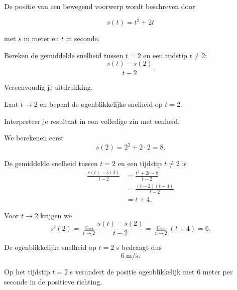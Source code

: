\documentclass{ximera}
\begin{document}
\begin{oefening}{\oefU\ESS}

De positie van een bewegend voorwerp wordt beschreven door

\[
s(t)=t^2+2t
\]

met $s$ in meter en $t$ in seconde.

\begin{question}
Bereken de gemiddelde snelheid tussen $t=2$ en een tijdstip $t\neq2$:
\[
\frac{s(t)-s(2)}{t-2}.
\]
\end{question}

\begin{question}
Vereenvoudig je uitdrukking.
\end{question}

\begin{question}
Laat $t\to2$ en bepaal de ogenblikkelijke snelheid op $t=2$.
\end{question}

\begin{question}
Interpreteer je resultaat in een volledige zin met eenheid.
\end{question}

\begin{oplossing}

We berekenen eerst
\[
s(2)=2^2+2\cdot2=8.
\]

De gemiddelde snelheid tussen $t=2$ en een tijdstip $t\neq2$ is
\[
\begin{aligned}
\frac{s(t)-s(2)}{t-2}
&=
\frac{t^2+2t-8}{t-2}\\
&=
\frac{(t-2)(t+4)}{t-2}\\
&=
t+4.
\end{aligned}
\]

Voor $t\to2$ krijgen we
\[
s'(2)
=
\lim_{t\to2}
\frac{s(t)-s(2)}{t-2}
=
\lim_{t\to2}(t+4)
=
\boxed{6}.
\]

De ogenblikkelijke snelheid op $t=2$ s bedraagt dus
\[
\boxed{6\ \mathrm{m/s}}.
\]

Op het tijdstip $t=2$ s verandert de positie ogenblikkelijk met
$6$ meter per seconde in de positieve richting.

\end{oplossing}

\end{oefening}


\end{document}

